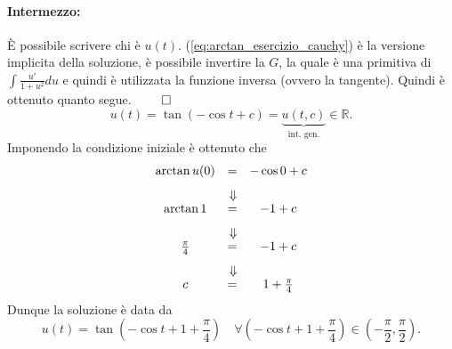 \begin{example}
    \paragraph{Intermezzo:} È possibile scrivere chi è $u(t)$. (\ref{eq:arctan_esercizio_cauchy}) è la versione implicita della soluzione, è possibile invertire la $G$, la quale è una primitiva di $\int \frac{u'}{1+u^2}du$ e quindi è utilizzata la funzione inversa (ovvero la tangente). Quindi è ottenuto quanto segue. $\qed$
    \begin{equation*}
        u(t) = \tan(-\cos t + c)= \underbrace{u(t, c)}_\text{int. gen.}\in\mathbb R.
    \end{equation*}
    Imponendo la condizione iniziale è ottenuto che
    \begin{equation*}
       \begin{matrix}
            \arctan u(0) &=& -\cos 0 + c\\
            &\Vertrarrow&\\
            \arctan 1 &=& -1 + c\\
            &\Vertrarrow&\\
            \frac{\pi}{4} &=& -1 + c\\
            &\Vertrarrow&\\
            c &=& 1+\frac{\pi}{4}
       \end{matrix}
    \end{equation*}
    Dunque la soluzione è data da
    \begin{equation*}
    	u(t)=\tan\left(-\cos t + 1 + \frac{\pi}{4}\right)\quad \forall\left(-\cos t + 1 + \frac{\pi}{4}\right)\in\left(-\frac{\pi}{2}, \frac{\pi}{2}\right).
    \end{equation*}
\end{example}

